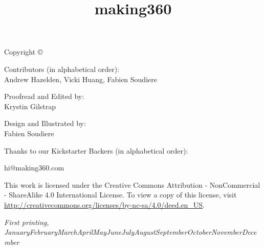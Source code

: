 \documentclass[notoc, justified]{tufte-book} %
\title{making360} %
\author{} %
\newcommand{\monthyear}{\ifcase\month\or January\or February\or March\or April\or May\or June\or July\or August\or September\or October\or November\or December\fi\space\number\year} %
\begin{document}
\setlength{\parskip}{12pt}
\setlength{\parindent}{0pt}
\let\cleardoublepage\clearpage

\makeatletter
\def\@makechapterhead#1{%
  {\parindent \z@ \raggedright \normalfont
    \ifnum \c@secnumdepth >\m@ne
        \huge\bfseries \@chapapp\space \thechapter
        \par\nobreak
        \vskip 20\p@
    \fi
    \interlinepenalty\@M
    \Huge \bfseries #1\par\nobreak
    \vskip 20\p@
  }}
\makeatother


\frontmatter



\maketitlepage


\newpage
\begin{fullwidth}
\thispagestyle{empty}
\setlength{\parindent}{0pt}
\setlength{\parskip}{\baselineskip}
Copyright \copyright\ \the\year\ \thanklessauthor

\par{Contributors (in alphabetical order):
\\
Andrew Hazelden, Vicki Huang, Fabien Soudiere}

\par{Proofread and Edited by:
\\
Krystin Gilstrap}

\par{Design and Illustrated by: 
\\
Fabien Soudiere}

\par{Thanks to our Kickstarter Backers (in alphabetical order):
\\
}

\par{hi@making360.com}

\par This work is licensed under the Creative Commons Attribution - NonCommercial - ShareAlike 4.0 International License. To view a copy of this license, visit \url{http://creativecommons.org/licenses/by-nc-sa/4.0/deed.en_US}.

\par\textit{First printing, \monthyear}
\end{fullwidth}
\end{document}
